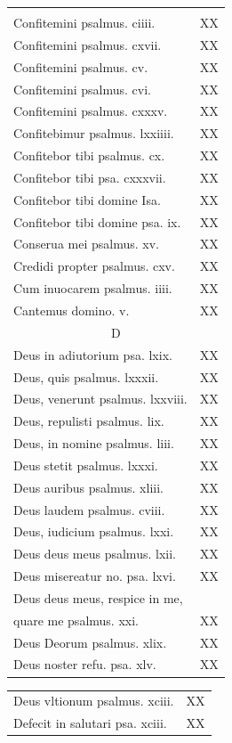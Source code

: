 \documentclass[a5paper,10pt]{book}
\begin{document}
\begin{center}
\begin{multicols*}{2}
\begin{tabular}{l r}
&\\
Confitemini psalmus. ciiii. & XX\\
Confitemini psalmus. cxvii. & XX\\
Confitemini psalmus. cv. & XX\\
Confitemini psalmus. cvi. & XX\\
Confitemini psalmus. cxxxv. & XX\\
Confitebimur psalmus. lxxiiii. & XX\\
Confitebor tibi psalmus. cx. & XX\\
Confitebor tibi psa. cxxxvii. & XX\\
Confitebor tibi domine Isa. & XX\\
Confitebor tibi domine psa. ix. & XX\\
Conserua mei psalmus. xv. & XX\\
Credidi propter psalmus. cxv. & XX\\
Cum inuocarem psalmus. iiii. & XX\\
Cantemus domino. v. & XX\\
\multicolumn{2}{c}{\color{red} D}\\
Deus in adiutorium psa. lxix. & XX\\
Deus, quis psalmus. lxxxii. & XX\\
Deus, venerunt psalmus. lxxviii. & XX\\
Deus, repulisti psalmus. lix. & XX\\
Deus, in nomine psalmus. liii. & XX\\
Deus stetit psalmus. lxxxi. & XX\\
Deus auribus psalmus. xliii. & XX\\
Deus laudem psalmus. cviii. & XX\\
Deus, iudicium psalmus. lxxi. & XX\\
Deus deus meus psalmus. lxii. & XX\\
Deus misereatur no. psa. lxvi. & XX\\
\multicolumn{2}{l}{Deus deus meus, respice in me,}\\
\quad quare me psalmus. xxi. & XX\\
Deus Deorum psalmus. xlix. & XX\\
Deus noster refu. psa. xlv. & XX\\
\end{tabular}
\begin{tabular}{l r}
Deus vltionum psalmus. xciii. & XX\\
Defecit in salutari psa. xciii. & XX\\

\end{tabular}
\end{multicols*}
\end{center}
\end{document}
